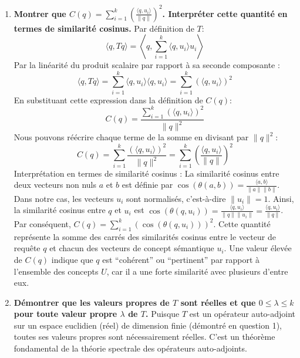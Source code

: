 \documentclass[11pt,a4paper]{report}
\begin{document}
\begin{enumerate}
  \begin{enumerate}
  \def\labelenumii{\alph{enumii}.}
  \item
    \textbf{Montrer que
    \(C(q) = \sum_{i=1}^k \left( \frac{\langle q, u_i \rangle}{\|q\|} \right)^2\).
    Interpréter cette quantité en termes de similarité cosinus.} Par
    définition de \(T\):
    \[ \langle q, Tq \rangle = \left\langle q, \sum_{i=1}^k \langle q, u_i \rangle u_i \right\rangle \]
    Par la linéarité du produit scalaire par rapport à sa seconde
    composante :
    \[ \langle q, Tq \rangle = \sum_{i=1}^k \langle q, u_i \rangle \langle q, u_i \rangle = \sum_{i=1}^k (\langle q, u_i \rangle)^2 \]
    En substituant cette expression dans la définition de \(C(q)\):
    \[ C(q) = \frac{\sum_{i=1}^k (\langle q, u_i \rangle)^2}{\|q\|^2} \]
    Nous pouvons réécrire chaque terme de la somme en divisant par
    \(\|q\|^2\):
    \[ C(q) = \sum_{i=1}^k \frac{(\langle q, u_i \rangle)^2}{\|q\|^2} = \sum_{i=1}^k \left( \frac{\langle q, u_i \rangle}{\|q\|} \right)^2 \]
    Interprétation en termes de similarité cosinus : La similarité
    cosinus entre deux vecteurs non nuls \(a\) et \(b\) est définie par
    \(\cos(\theta(a, b)) = \frac{\langle a, b \rangle}{\|a\| \|b\|}\).
    Dans notre cas, les vecteurs \(u_i\) sont normalisés, c'est-à-dire
    \(\|u_i\|=1\). Ainsi, la similarité cosinus entre \(q\) et \(u_i\)
    est
    \(\cos(\theta(q, u_i)) = \frac{\langle q, u_i \rangle}{\|q\| \|u_i\|} = \frac{\langle q, u_i \rangle}{\|q\|}\).
    Par conséquent, \(C(q) = \sum_{i=1}^k (\cos(\theta(q, u_i)))^2\).
    Cette quantité représente la somme des carrés des similarités
    cosinus entre le vecteur de requête \(q\) et chacun des vecteurs de
    concept sémantique \(u_i\). Une valeur élevée de \(C(q)\) indique
    que \(q\) est ``cohérent'' ou ``pertinent'' par rapport à l'ensemble
    des concepts \(U\), car il a une forte similarité avec plusieurs
    d'entre eux.
  \item
    \textbf{Démontrer que les valeurs propres de \(T\) sont réelles et
    que \(0 \le \lambda \le k\) pour toute valeur propre \(\lambda\) de
    \(T\).} Puisque \(T\) est un opérateur auto-adjoint sur un espace
    euclidien (réel) de dimension finie (démontré en question 1), toutes
    ses valeurs propres sont nécessairement réelles. C'est un théorème
    fondamental de la théorie spectrale des opérateurs auto-adjoints.


\end{enumerate}
\end{enumerate}
\end{document}
